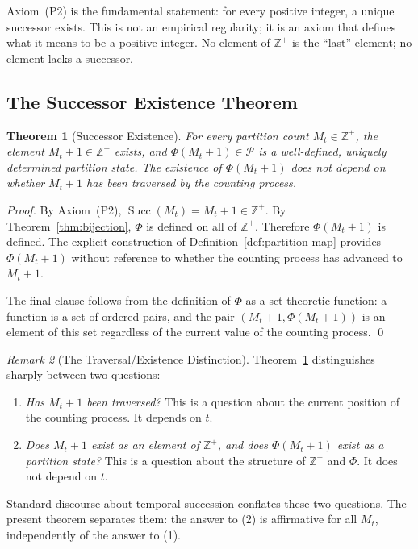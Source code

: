 \documentclass[twocolumn,10pt,a4paper]{article}
\theoremstyle{thmstyle}
\newtheorem{theorem}{Theorem}[section]
\theoremstyle{definition}
\theoremstyle{remark}
\newtheorem{remark}[theorem]{Remark}
\DeclareMathOperator{\Succ}{Succ}
\newcommand{\Zp}{\mathbb{Z}^{+}}
\newcommand{\Parts}{\mathcal{P}}
\newcommand{\PhiMap}{\varPhi}
\begin{document}
Axiom~(P2) is the fundamental statement: for every positive integer, a unique successor exists. This is not an empirical regularity; it is an axiom that defines what it means to be a positive integer. No element of $\Zp$ is the ``last'' element; no element lacks a successor.

\subsection{The Successor Existence Theorem}

\begin{theorem}[Successor Existence]
\label{thm:successor}
For every partition count $M_t \in \Zp$, the element $M_t + 1 \in \Zp$ exists, and $\PhiMap(M_t + 1) \in \Parts$ is a well-defined, uniquely determined partition state. The existence of $\PhiMap(M_t + 1)$ does not depend on whether $M_t + 1$ has been traversed by the counting process.
\end{theorem}

\begin{proof}
By Axiom~(P2), $\Succ(M_t) = M_t + 1 \in \Zp$. By Theorem~\ref{thm:bijection}, $\PhiMap$ is defined on all of $\Zp$. Therefore $\PhiMap(M_t + 1)$ is defined. The explicit construction of Definition~\ref{def:partition-map} provides $\PhiMap(M_t + 1)$ without reference to whether the counting process has advanced to $M_t + 1$.

The final clause follows from the definition of $\PhiMap$ as a set-theoretic function: a function is a set of ordered pairs, and the pair $(M_t + 1, \PhiMap(M_t + 1))$ is an element of this set regardless of the current value of the counting process. \qed
\end{proof}

\begin{remark}[The Traversal/Existence Distinction]
\label{rem:traversal}
Theorem~\ref{thm:successor} distinguishes sharply between two questions:
\begin{enumerate}[leftmargin=1.5em,itemsep=0.1em]
\item \emph{Has $M_t + 1$ been traversed?} This is a question about the current position of the counting process. It depends on $t$.
\item \emph{Does $M_t + 1$ exist as an element of $\Zp$, and does $\PhiMap(M_t + 1)$ exist as a partition state?} This is a question about the structure of $\Zp$ and $\PhiMap$. It does not depend on $t$.
\end{enumerate}
Standard discourse about temporal succession conflates these two questions. The present theorem separates them: the answer to (2) is affirmative for all $M_t$, independently of the answer to (1).
\end{remark}
\end{document}
